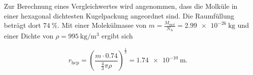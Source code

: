 Zur Berechnung eines Vergleichwertes wird angenommen, dass die Molküle in einer hexagonal dichtesten Kugelpackung angeordnet 
sind. Die Raumfüllung beträgt dort $\SI{74}{\percent}$. Mit einer Molekülmasse von $m = \frac{M_\text{mol}}{N_\text{A}} = \SI{2.99e-26}{\kilo\gram}$
und einer Dichte von $\rho=\SI{995}{\kilo\gram\per\metre^3}$\cite{rho} ergibt sich

\begin{equation}
  r_\text{hcp} = \left(\frac{m\cdot 0.74}{\frac{4}{3}\pi\rho}\right)^{\frac{1}{3}} = \SI{1.74e-10}{\metre}.
\end{equation}

